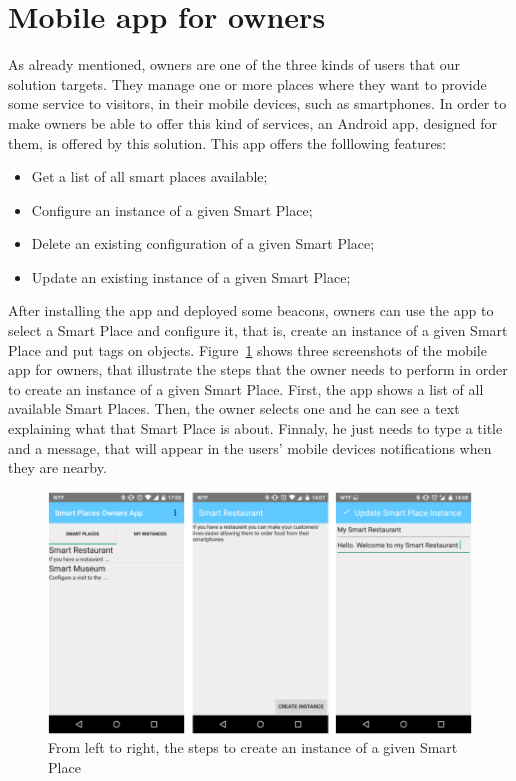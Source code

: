 \section{Mobile app for owners}
\label{sec:solution_mobile_app_for_owners}
As already mentioned, owners are one of the three kinds of users that our solution targets.
They manage one or more places where they want to provide some service to visitors, in their mobile devices, such as smartphones.
In order to make owners be able to offer this kind of services, an Android app, designed for them, is offered by this solution.
This app offers the folllowing features:
\begin{itemize}
  \item Get a list of all smart places available;
  \item Configure an instance of a given Smart Place;
  \item Delete an existing configuration of a given Smart Place;
  \item Update an existing instance of a given Smart Place;
\end{itemize}

After installing the app and deployed some beacons, owners can use the app to select a Smart Place and configure it, that is, create an instance of a given Smart Place and put tags on objects. Figure~\ref{fig:screenshot_ownersapp} shows three screenshots of the mobile app for owners, that illustrate the steps that the owner needs to perform in order to create an instance of a given Smart Place.
First, the app shows a list of all available Smart Places.
Then, the owner selects one and he can see a text explaining what that Smart Place is about.
Finnaly, he just needs to type a title and a message, that will appear in the users' mobile devices notifications when they are nearby.

\begin{figure}[!ht]
  \centering
    \includegraphics[width=1\textwidth, keepaspectratio]{images/screenshots/ownersapp}
    \caption{From left to right, the steps to create an instance of a given Smart Place}
    \label{fig:screenshot_ownersapp}
\end{figure}

